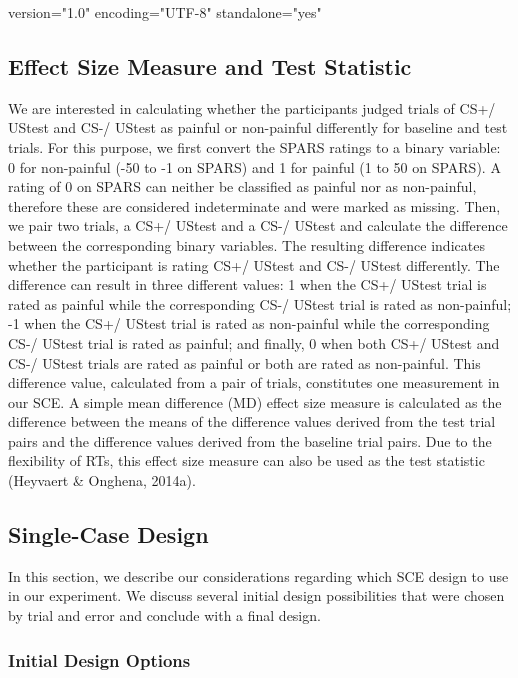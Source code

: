 version="1.0" encoding="UTF-8" standalone="yes" \documentclass{article}
\begin{document}
\subsection{Effect Size Measure and Test Statistic}

We are interested in calculating whether the participants judged trials of CS+/ UStest and CS-/ UStest as painful or non-painful differently for baseline and test trials. For this purpose, we first convert the SPARS ratings to a binary variable: 0 for non-painful (-50 to -1 on SPARS) and 1 for painful (1 to 50 on SPARS). A rating of 0 on SPARS can neither be classified as painful nor as non-painful, therefore these are considered indeterminate and were marked as missing. Then, we pair two trials, a CS+/ UStest and a CS-/ UStest and calculate the difference between the corresponding binary variables. The resulting difference indicates whether the participant is rating CS+/ UStest and CS-/ UStest differently. The difference can result in three different values: 1 when the CS+/ UStest trial is rated as painful while the corresponding CS-/ UStest trial is rated as non-painful; -1 when the CS+/ UStest trial is rated as non-painful while the corresponding CS-/ UStest trial is rated as painful; and finally, 0 when both CS+/ UStest and CS-/ UStest trials are rated as painful or both are rated as non-painful. This difference value, calculated from a pair of trials, constitutes one measurement in our SCE. A simple mean difference (MD) effect size measure is calculated as the difference between the means of the difference values derived from the test trial pairs and the difference values derived from the baseline trial pairs. Due to the flexibility of RTs, this effect size measure can also be used as the test statistic (Heyvaert \& Onghena, 2014a). 

\subsection{Single-Case Design }

In this section, we describe our considerations regarding which SCE design to use in our experiment. We discuss several initial design possibilities that were chosen by trial and error and conclude with a final design.

\subsubsection{Initial Design Options}
\end{document}
